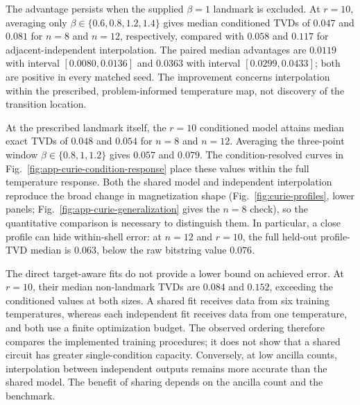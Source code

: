 \documentclass[pra,aps,10pt,twocolumn,floatfix,superscriptaddress,
notitlepage,longbibliography]{revtex4-2}
\begin{document}
The advantage persists when the supplied $\beta=1$ landmark is excluded. At $r=10$, averaging only $\beta\in\{0.6,0.8,1.2,1.4\}$ gives median conditioned TVDs of $0.047$ and $0.081$ for $n=8$ and $n=12$, respectively, compared with $0.058$ and $0.117$ for adjacent-independent interpolation. The paired median advantages are $0.0119$ with interval $[0.0080,0.0136]$ and $0.0363$ with interval $[0.0299,0.0433]$; both are positive in every matched seed. The improvement concerns interpolation within the prescribed, problem-informed temperature map, not discovery of the transition location.

At the prescribed landmark itself, the $r=10$ conditioned model attains median exact TVDs of $0.048$ and $0.054$ for $n=8$ and $n=12$. Averaging the three-point window $\beta\in\{0.8,1,1.2\}$ gives $0.057$ and $0.079$. The condition-resolved curves in Fig.~\ref{fig:app-curie-condition-response} place these values within the full temperature response. Both the shared model and independent interpolation reproduce the broad change in magnetization shape (Fig.~\ref{fig:curie-profiles}, lower panels; Fig.~\ref{fig:app-curie-generalization} gives the $n=8$ check), so the quantitative comparison is necessary to distinguish them. In particular, a close profile can hide within-shell error: at $n=12$ and $r=10$, the full held-out profile-TVD median is $0.063$, below the raw bitstring value $0.076$.

The direct target-aware fits do not provide a lower bound on achieved error. At $r=10$, their median non-landmark TVDs are $0.084$ and $0.152$, exceeding the conditioned values at both sizes. A shared fit receives data from six training temperatures, whereas each independent fit receives data from one temperature, and both use a finite optimization budget. The observed ordering therefore compares the implemented training procedures; it does not show that a shared circuit has greater single-condition capacity. Conversely, at low ancilla counts, interpolation between independent outputs remains more accurate than the shared model. The benefit of sharing depends on the ancilla count and the benchmark.
\end{document}
